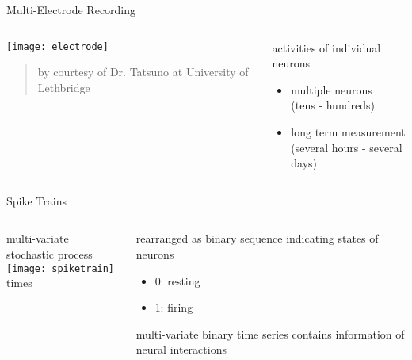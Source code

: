 \documentclass[fleqn,aspectratio=1610]{beamer}
\begin{document}
\begin{frame}[label={sec:orged4c03f}]{Multi-Electrode Recording}
\begin{columns}
\begin{column}{0.5\columnwidth}
\texttt{[image: electrode]}
\begin{quote}
\tiny
by courtesy of Dr. Tatsuno
at University of Lethbridge
\end{quote}
\end{column}
\begin{column}{0.5\columnwidth}
activities of individual neurons

\begin{itemize}
\item multiple neurons\\[0pt]
(tens - hundreds)
\item long term measurement\\[0pt]
(several hours - several days)
\end{itemize}
\end{column}
\end{columns}
\end{frame}

\begin{frame}[label={sec:orgcb88e45}]{Spike Trains}
\begin{columns}
\begin{column}{0.6\columnwidth}
\centering
multi-variate stochastic process\\[5pt]
\texttt{[image: spiketrain]}\\
times
\end{column}
\begin{column}{0.4\columnwidth}
rearranged as binary sequence
indicating states of neurons
\begin{itemize}
\item 0: resting
\item 1: firing
\end{itemize}
\bigskip

multi-variate binary time series contains
information of neural interactions
\end{column}
\end{columns}
\end{frame}
\end{document}
